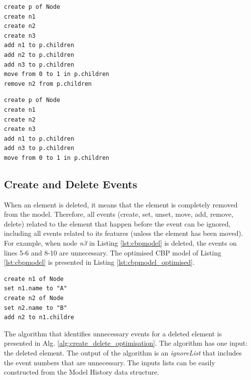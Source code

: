 \documentclass{llncs}
\begin{document}
\noindent
\begin{minipage}[t]{0.5\linewidth}
\begin{lstlisting}[style=eol,caption={The CBP representation of attribute \emph{values}'s move event.},label=lst:move_attribute_example]
create p of Node
create n1
create n2
create n3
add n1 to p.children
add n2 to p.children
add n3 to p.children
move from 0 to 1 in p.children
remove n2 from p.children
\end{lstlisting}
\end{minipage}
\hfill
\begin{minipage}[t]{0.5\linewidth}
\begin{lstlisting}[style=eol,caption={The optimised CBP representation of attribute \emph{values}'s event.},label=lst:move_attribute_example_error]
create p of Node
create n1
create n2
create n3
add n1 to p.children
add n3 to p.children
move from 0 to 1 in p.children
\end{lstlisting}
\end{minipage}





\subsection{Create and Delete Events}
\label{subsec:create_and_delete_operations}
When an element is deleted, it means that the element is completely removed from the model.
Therefore, all events (create, set, unset, move, add, remove, delete) related to the element that happen before the event can be ignored, including all events related to its features (unless the element has been moved).
For example, when node \emph{n3} in Listing \ref{lst:cbpmodel}  is deleted, the events on lines 5-6 and 8-10 are unnecessary.
The optimised CBP model of Listing \ref{lst:cbpmodel} is presented in Listing \ref{lst:cbpmodel_optimised}.

\begin{lstlisting}[style=eol,caption={Change-based representation of the model of Figure \ref{fig:initial_model} after removal of node \emph{n5}.},label=lst:cbpmodel_optimised]
create n1 of Node
set n1.name to "A"
create n2 of Node
set n2.name to "B"
add n2 to n1.childre
\end{lstlisting}

The algorithm that identifies unnecessary events for a deleted element is presented in Alg. \ref{alg:create_delete_optimisation}.
The algorithm has one input: the deleted element.
The output of the algorithm is an \emph{ignoreList} that includes the event numbers that are unnecessary.
The inputs lists can be easily constructed from the Model History data structure.
\end{document}
